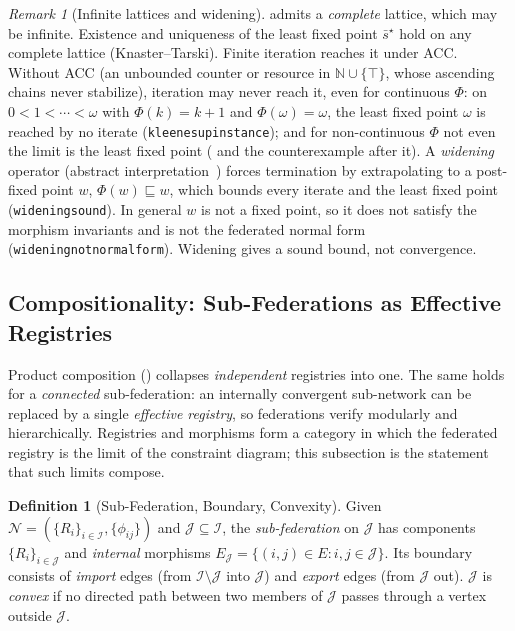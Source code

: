 \documentclass[11pt,a4paper]{article}
\theoremstyle{plain}
\theoremstyle{definition}
\newtheorem{definition}[theorem]{Definition}
\theoremstyle{remark}
\newtheorem{remark}[theorem]{Remark}
\renewcommand{\_}{\textunderscore\allowbreak}
\begin{document}
\begin{remark}[Infinite lattices and widening]
\label{rem:infinite-lattice}
 admits a \emph{complete} lattice, which may be
infinite.  Existence and uniqueness of the least fixed point $\bar{s}^{\star}$
hold on any complete lattice (Knaster--Tarski).  Finite iteration reaches it
under ACC.  Without ACC (an unbounded counter or resource in
$\mathbb{N} \cup \{\top\}$, whose ascending chains never stabilize), iteration
may never reach it, even for continuous $\Phi$: on $0 < 1 < \cdots < \omega$
with $\Phi(k) = k{+}1$ and $\Phi(\omega) = \omega$, the least fixed point
$\omega$ is reached by no iterate (\texttt{kleene\_sup\_instance}); and for
non-continuous $\Phi$ not even the limit is the least fixed point
( and the counterexample after it).  A
\emph{widening} operator (abstract interpretation~\cite{cousot1977}) forces
termination by extrapolating to a post-fixed point $w$, $\Phi(w) \sqsubseteq w$,
which bounds every iterate and the least fixed point
(\texttt{widening\_sound}).  In general $w$ is not a fixed point, so it does not
satisfy the morphism invariants and is not the federated normal form
(\texttt{widening\_not\_normal\_form}).  Widening gives a sound bound, not
convergence.
\end{remark}

\subsection{Compositionality: Sub-Federations as Effective Registries}
\label{sec:compositionality}

Product composition () collapses \emph{independent} registries
into one.  The same holds for a \emph{connected} sub-federation: an internally
convergent sub-network can be replaced by a single \emph{effective registry},
so federations verify modularly and hierarchically.  Registries and morphisms
form a category in which the federated registry is the limit of the constraint
diagram; this subsection is the statement that such limits compose.

\begin{definition}[Sub-Federation, Boundary, Convexity]
\label{def:subfed}
Given $\mathcal{N} = (\{R_i\}_{i \in \mathcal{I}}, \{\phi_{ij}\})$ and
$\mathcal{J} \subseteq \mathcal{I}$, the \emph{sub-federation} on $\mathcal{J}$
has components $\{R_i\}_{i \in \mathcal{J}}$ and \emph{internal} morphisms
$E_{\mathcal{J}} = \{(i,j) \in E : i, j \in \mathcal{J}\}$.  Its boundary
consists of \emph{import} edges (from $\mathcal{I}\setminus\mathcal{J}$ into
$\mathcal{J}$) and \emph{export} edges (from $\mathcal{J}$ out).  $\mathcal{J}$
is \emph{convex} if no directed path between two members of $\mathcal{J}$ passes
through a vertex outside $\mathcal{J}$.
\end{definition}
\end{document}
